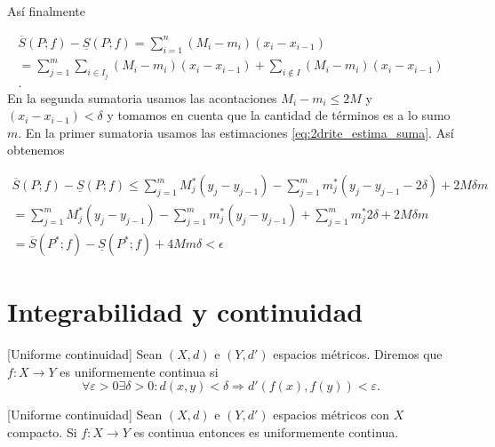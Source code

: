 \begin{demo}
Así finalmente

\begin{multline*}\label{eq:crite2_cuentas}
 \overline{S}(P;f)-\underline{S}(P;f)=\sum_{i=1}^n(M_i-m_i)(x_i-x_{i-1})\\
 =\sum_{j=1}^m \sum_{i\in I_j}(M_i-m_i)(x_i-x_{i-1})+ \sum_{i\notin I}(M_i-m_i)(x_i-x_{i-1})\\  .
\end{multline*}
En la segunda sumatoria usamos las acontaciones $M_i-m_i\leq 2M$ y $(x_i-x_{i-1})<\delta$ y tomamos en cuenta que la cantidad de términos es a lo sumo $m$. En la primer sumatoria usamos las estimaciones \eqref{eq:2drite_estima_suma}. Así obtenemos

\begin{multline*}
 \overline{S}(P;f)-\underline{S}(P;f)
 \leq \sum_{j=1}^m  M^*_j(y_j-y_{j-1})-\sum_{j=1}^m  m^*_j(y_j-y_{j-1}-2\delta)+ 2M\delta m
 \\
 =\sum_{j=1}^m  M^*_j(y_j-y_{j-1})-\sum_{j=1}^m  m^*_j(y_j-y_{j-1})+ \sum_{j=1}^m m^*_j 2\delta +2M\delta m
 \\ 
 = \overline{S}(P^*;f)-\underline{S}(P^*;f)+4Mm\delta<\epsilon
\end{multline*}
 
\end{demo}



\section{Integrabilidad y continuidad}


\begin{definicion}{}[Uniforme continuidad]  Sean $(X,d)$ e $(Y,d')$ espacios métricos. Diremos que $f:X\to Y$ es uniformemente continua si 
\[
 \forall\varepsilon>0\exists \delta>0:d(x,y)<\delta\Rightarrow d'(f(x),f(y))<\varepsilon.
\]

 
\end{definicion}

\begin{teorema}{}[Uniforme continuidad] 
 Sean $(X,d)$ e $(Y,d')$ espacios métricos con $X$ compacto. Si $f:X\to Y$ es continua entonces es uniformemente continua.

\end{teorema}

